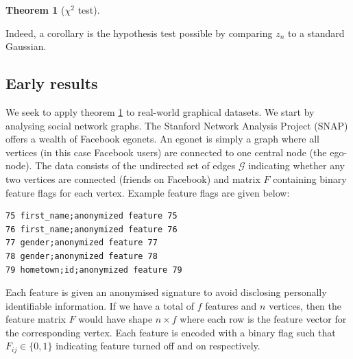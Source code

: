 \documentclass[11pt]{article}
\newcommand{\Gcal}{\mathcal{G}}
\newtheorem{theorem}{Theorem}[section]
\begin{document}
\begin{multicols*}{2}
\begin{theorem}[$\chi^2$ test]
	\label{theorem:hyp-test-sbm-chi}
\end{theorem}

Indeed, a corollary is the hypothesis test possible by comparing $z_n$ to a standard Gaussian.

\subsection{Early results}

We seek to apply theorem \ref{theorem:hyp-test-sbm-chi} to real-world graphical datasets. We start by analysing social network graphs. The Stanford Network Analysis Project (SNAP) \cite{snapnets} offers a wealth of Facebook egonets. An egonet is simply a graph where all vertices (in this case Facebook users) are connected to one central node (the ego-node). The data consists of the undirected set of edges $\Gcal$ indicating whether any two vertices are connected (friends on Facebook) and matrix $F$ containing binary feature flags for each vertex. Example feature flags are given below: \\

\begin{center}
\begin{minipage}{8cm}
\begin{Verbatim}[fontsize=\small, frame=single, label={\fbox{Example anonymised feature flags}}]
75 first_name;anonymized feature 75
76 first_name;anonymized feature 76
77 gender;anonymized feature 77
78 gender;anonymized feature 78
79 hometown;id;anonymized feature 79
\end{Verbatim}
\end{minipage}
\end{center}


Each feature is given an anonymised signature to avoid disclosing personally identifiable information. If we have a total of $f$ features and $n$ vertices, then the feature matrix $F$ would have shape $n \times f$ where each row is the feature vector for the corresponding vertex. Each feature is encoded with a binary flag such that $F_{ij} \in \{0, 1\}$ indicating feature turned off and on respectively.


\end{multicols*}
\end{document}
